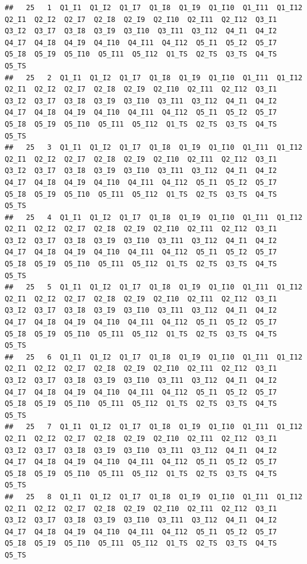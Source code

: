 \documentclass[]{book}
\begin{document}
\begin{verbatim}
##   25   1  Q1_I1  Q1_I2  Q1_I7  Q1_I8  Q1_I9  Q1_I10  Q1_I11  Q1_I12  Q2_I1  Q2_I2  Q2_I7  Q2_I8  Q2_I9  Q2_I10  Q2_I11  Q2_I12  Q3_I1  Q3_I2  Q3_I7  Q3_I8  Q3_I9  Q3_I10  Q3_I11  Q3_I12  Q4_I1  Q4_I2  Q4_I7  Q4_I8  Q4_I9  Q4_I10  Q4_I11  Q4_I12  Q5_I1  Q5_I2  Q5_I7  Q5_I8  Q5_I9  Q5_I10  Q5_I11  Q5_I12  Q1_TS  Q2_TS  Q3_TS  Q4_TS  Q5_TS
##   25   2  Q1_I1  Q1_I2  Q1_I7  Q1_I8  Q1_I9  Q1_I10  Q1_I11  Q1_I12  Q2_I1  Q2_I2  Q2_I7  Q2_I8  Q2_I9  Q2_I10  Q2_I11  Q2_I12  Q3_I1  Q3_I2  Q3_I7  Q3_I8  Q3_I9  Q3_I10  Q3_I11  Q3_I12  Q4_I1  Q4_I2  Q4_I7  Q4_I8  Q4_I9  Q4_I10  Q4_I11  Q4_I12  Q5_I1  Q5_I2  Q5_I7  Q5_I8  Q5_I9  Q5_I10  Q5_I11  Q5_I12  Q1_TS  Q2_TS  Q3_TS  Q4_TS  Q5_TS
##   25   3  Q1_I1  Q1_I2  Q1_I7  Q1_I8  Q1_I9  Q1_I10  Q1_I11  Q1_I12  Q2_I1  Q2_I2  Q2_I7  Q2_I8  Q2_I9  Q2_I10  Q2_I11  Q2_I12  Q3_I1  Q3_I2  Q3_I7  Q3_I8  Q3_I9  Q3_I10  Q3_I11  Q3_I12  Q4_I1  Q4_I2  Q4_I7  Q4_I8  Q4_I9  Q4_I10  Q4_I11  Q4_I12  Q5_I1  Q5_I2  Q5_I7  Q5_I8  Q5_I9  Q5_I10  Q5_I11  Q5_I12  Q1_TS  Q2_TS  Q3_TS  Q4_TS  Q5_TS
##   25   4  Q1_I1  Q1_I2  Q1_I7  Q1_I8  Q1_I9  Q1_I10  Q1_I11  Q1_I12  Q2_I1  Q2_I2  Q2_I7  Q2_I8  Q2_I9  Q2_I10  Q2_I11  Q2_I12  Q3_I1  Q3_I2  Q3_I7  Q3_I8  Q3_I9  Q3_I10  Q3_I11  Q3_I12  Q4_I1  Q4_I2  Q4_I7  Q4_I8  Q4_I9  Q4_I10  Q4_I11  Q4_I12  Q5_I1  Q5_I2  Q5_I7  Q5_I8  Q5_I9  Q5_I10  Q5_I11  Q5_I12  Q1_TS  Q2_TS  Q3_TS  Q4_TS  Q5_TS
##   25   5  Q1_I1  Q1_I2  Q1_I7  Q1_I8  Q1_I9  Q1_I10  Q1_I11  Q1_I12  Q2_I1  Q2_I2  Q2_I7  Q2_I8  Q2_I9  Q2_I10  Q2_I11  Q2_I12  Q3_I1  Q3_I2  Q3_I7  Q3_I8  Q3_I9  Q3_I10  Q3_I11  Q3_I12  Q4_I1  Q4_I2  Q4_I7  Q4_I8  Q4_I9  Q4_I10  Q4_I11  Q4_I12  Q5_I1  Q5_I2  Q5_I7  Q5_I8  Q5_I9  Q5_I10  Q5_I11  Q5_I12  Q1_TS  Q2_TS  Q3_TS  Q4_TS  Q5_TS
##   25   6  Q1_I1  Q1_I2  Q1_I7  Q1_I8  Q1_I9  Q1_I10  Q1_I11  Q1_I12  Q2_I1  Q2_I2  Q2_I7  Q2_I8  Q2_I9  Q2_I10  Q2_I11  Q2_I12  Q3_I1  Q3_I2  Q3_I7  Q3_I8  Q3_I9  Q3_I10  Q3_I11  Q3_I12  Q4_I1  Q4_I2  Q4_I7  Q4_I8  Q4_I9  Q4_I10  Q4_I11  Q4_I12  Q5_I1  Q5_I2  Q5_I7  Q5_I8  Q5_I9  Q5_I10  Q5_I11  Q5_I12  Q1_TS  Q2_TS  Q3_TS  Q4_TS  Q5_TS
##   25   7  Q1_I1  Q1_I2  Q1_I7  Q1_I8  Q1_I9  Q1_I10  Q1_I11  Q1_I12  Q2_I1  Q2_I2  Q2_I7  Q2_I8  Q2_I9  Q2_I10  Q2_I11  Q2_I12  Q3_I1  Q3_I2  Q3_I7  Q3_I8  Q3_I9  Q3_I10  Q3_I11  Q3_I12  Q4_I1  Q4_I2  Q4_I7  Q4_I8  Q4_I9  Q4_I10  Q4_I11  Q4_I12  Q5_I1  Q5_I2  Q5_I7  Q5_I8  Q5_I9  Q5_I10  Q5_I11  Q5_I12  Q1_TS  Q2_TS  Q3_TS  Q4_TS  Q5_TS
##   25   8  Q1_I1  Q1_I2  Q1_I7  Q1_I8  Q1_I9  Q1_I10  Q1_I11  Q1_I12  Q2_I1  Q2_I2  Q2_I7  Q2_I8  Q2_I9  Q2_I10  Q2_I11  Q2_I12  Q3_I1  Q3_I2  Q3_I7  Q3_I8  Q3_I9  Q3_I10  Q3_I11  Q3_I12  Q4_I1  Q4_I2  Q4_I7  Q4_I8  Q4_I9  Q4_I10  Q4_I11  Q4_I12  Q5_I1  Q5_I2  Q5_I7  Q5_I8  Q5_I9  Q5_I10  Q5_I11  Q5_I12  Q1_TS  Q2_TS  Q3_TS  Q4_TS  Q5_TS

\end{verbatim}
\end{document}
